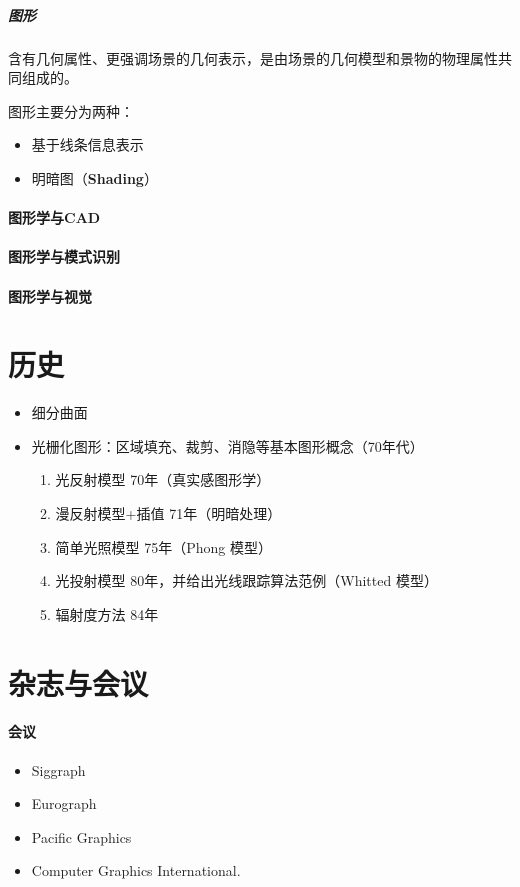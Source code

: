 \documentclass[UTF8,a4paper,12pt]{ctexbook}
\begin{document}
			\subparagraph{图形}
				含有几何属性、更强调场景的几何表示，是由场景的几何模型和景物的物理属性共同组成的。
				
				图形主要分为两种：
				\begin{itemize}[itemindent = 1em]
					\item 基于线条信息表示
					\item 明暗图（\textbf{Shading}）
				\end{itemize}
		
		\paragraph{图形学与CAD}
		\paragraph{图形学与模式识别}
		\paragraph{图形学与视觉}

	\section{历史}
		\begin{itemize}
			\item 细分曲面
			\item 光栅化图形：区域填充、裁剪、消隐等基本图形概念（70年代）
			\begin{enumerate}
				\item 光反射模型 70年（真实感图形学）
				\item 漫反射模型+插值 71年（明暗处理）
				\item 简单光照模型 75年（Phong 模型）
				\item 光投射模型 80年，并给出光线跟踪算法范例（Whitted 模型）
				\item 辐射度方法 84年
			\end{enumerate}

		\end{itemize}
		
	\section{杂志与会议}
		\paragraph{会议}
		\begin{itemize}
			\item Siggraph 
			\item Eurograph
			\item Pacific Graphics
			\item Computer Graphics International.
		\end{itemize}
		
\end{document}
